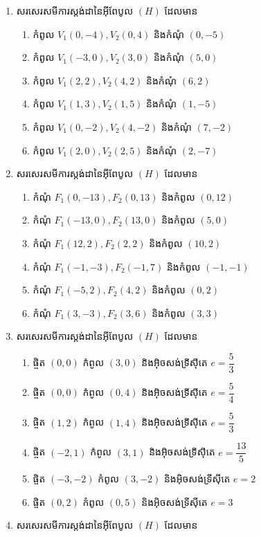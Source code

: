 \begin{enumerate}
	\item សរសេរសមីការស្តង់ដានៃអ៊ីពែបូល $ (H) $ ដែលមាន
	\begin{enumerate}
		\item កំពូល $ V_1(0,-4), V_2(0,4) $ និងកំណុំ $ (0,-5) $
		\item កំពូល $ V_1(-3,0), V_2(3,0) $ និងកំណុំ $ (5,0) $
		\item កំពូល $ V_1(2,2), V_2(4,2) $ និងកំណុំ $ (6,2) $
		\item កំពូល $ V_1(1,3), V_2(1,5) $ និងកំណុំ $ (1,-5) $
		\item កំពូល $ V_1(0,-2), V_2(4,-2) $ និងកំណុំ $ (7,-2) $
		\item កំពូល $ V_1(2,0), V_2(2,5) $ និងកំណុំ $ (2,-7) $
	\end{enumerate}
	\item សរសេរសមីការស្តង់ដានៃអ៊ីពែបូល $ (H) $ ដែលមាន
	\begin{enumerate}
		\item កំណុំ $ F_1(0,-13), F_2(0,13) $ និងកំពូល $ (0,12) $
		\item កំណុំ $ F_1(-13,0), F_2(13,0) $ និងកំពូល $ (5,0) $
		\item កំណុំ $ F_1(12,2), F_2(2,2) $ និងកំពូល $ (10,2) $
		\item កំណុំ $ F_1(-1,-3), F_2(-1,7) $ និងកំពូល $ (-1,-1) $
		\item កំណុំ $ F_1(-5,2), F_2(4,2) $ និងកំពូល $ (0,2) $
		\item កំណុំ $ F_1(3,-3), F_2(3,6) $ និងកំពូល $ (3,3) $
	\end{enumerate}
	\item សរសេរសមីការស្តង់ដានៃអ៊ីពែបូល $ (H) $ ដែលមាន
	\begin{enumerate}
		\item ផ្ចិត $ (0,0) $ កំពូល $ (3,0) $ និងអ៊ិចសង់ទ្រីស៊ីតេ $ e=\dfrac{5}{3} $
		\item ផ្ចិត $ (0,0) $ កំពូល $ (0,4) $ និងអ៊ិចសង់ទ្រីស៊ីតេ $ e=\dfrac{5}{4} $
		\item ផ្ចិត $ (1,2) $ កំពូល $ (1,4) $ និងអ៊ិចសង់ទ្រីស៊ីតេ $ e=\dfrac{5}{3} $
		\item ផ្ចិត $ (-2,1) $ កំពូល $ (3,1) $ និងអ៊ិចសង់ទ្រីស៊ីតេ $ e=\dfrac{13}{5} $
		\item ផ្ចិត $ (-3,-2) $ កំពូល $ (3,-2) $ និងអ៊ិចសង់ទ្រីស៊ីតេ $ e=2 $
		\item ផ្ចិត $ (0,2) $ កំពូល $ (0,5) $ និងអ៊ិចសង់ទ្រីស៊ីតេ $ e=3 $
	\end{enumerate}
	\item សរសេរសមីការស្តង់ដានៃអ៊ីពែបូល $ (H) $ ដែលមាន
	\begin{enumerate}

\end{enumerate}
\end{enumerate}
